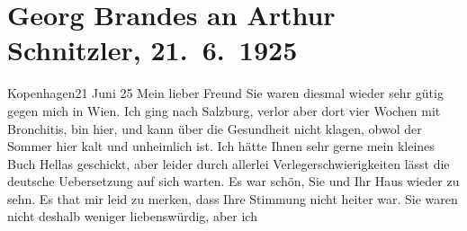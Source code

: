 

         
         \renewcommand{\erwaehntePersonen}{Personen:  ?? [Kusine von Gertrud Rung], Georg Brandes, Gertrud Rung, Otto Rung}
         \renewcommand{\erwaehnteInstitutionen}{Institutionen: Akademie der Wissenschaften}
         \renewcommand{\erwaehnteOrte}{Orte: Burgtheater, Italien, Kopenhagen, Moskau, Russland, Salzburg, Sankt Petersburg, Wien}
         \renewcommand{\erwaehnteWerke}{Werke: Der Schleier der Beatrice. Schauspiel in fünf Akten, Hellas}
               \section[Georg Brandes an Arthur Schnitzler, 21. 6. 1925]{ Georg Brandes an Arthur Schnitzler, 21. 6. 1925}\nopagebreak{}\rehead{ }\begin{ledgroupsized}[t]{13cm}\normalsize\beginnumbering \toendnotes[C]{\smallbreak\pagebreak[2]} 
\toendnotes[C]{\smallbreak}\pstart
           \raggedleft{}{\pb}Kopenhagen21 Juni 25\pend
           \pstart{}Mein lieber Freund\pend\pstart
           Sie waren diesmal wieder sehr gütig gegen mich in Wien. Ich ging nach Salzburg, verlor aber
               dort vier Wochen mit Bronchitis, bin hier, und kann über die Gesundheit nicht klagen,
               obwol der Sommer hier kalt und unheimlich ist.\pend
           \pstart
           Ich hätte Ihnen sehr gerne mein kleines Buch Hellas geschickt, aber leider durch allerlei Verlegerschwierigkeiten lässt
               die deutsche Uebersetzung auf sich warten.\pend
           \pstart
           Es war schön, Sie und Ihr Haus wieder zu sehn. Es that mir leid zu merken, dass Ihre
               Stimmung nicht heiter war. Sie waren nicht deshalb weniger liebenswürdig, aber ich

\end{ledgroupsized}
